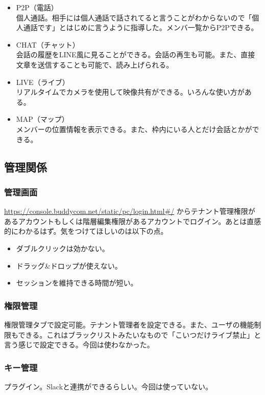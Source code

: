 \documentclass[dvipdfmx,jb5]{jreport}
\begin{document}
\begin{itemize}
\begin{itemize}
            \end{itemize}
      \item P2P（電話）\\
            個人通話。相手には個人通話で話されてると言うことがわからないので「個人通話です」とはじめに言うように指導した。メンバ一覧からP2Pできる。
      \item CHAT（チャット）\\
            会話の履歴をLINE風に見ることができる。会話の再生も可能。また、直接文章を送信することも可能で、読み上げられる。
      \item LIVE（ライブ）\\
            リアルタイムでカメラを使用して映像共有ができる。いろんな使い方がある。
      \item MAP（マップ）\\
            メンバーの位置情報を表示できる。また、枠内にいる人とだけ会話とかができる。
\end{itemize}

\subsection{管理関係}
\subsubsection{管理画面}
\url{https://console.buddycom.net/static/pc/login.html#/} からテナント管理権限があるアカウントもしくは階層編集権限があるアカウントでログイン。あとは直感的にわかるはず。気をつけてほしいのは以下の点。

\begin{itemize}
      \item ダブルクリックは効かない。
      \item ドラッグ\&ドロップが使えない。
      \item セッションを維持できる時間が短い。
\end{itemize}

\subsubsection{権限管理}
権限管理タブで設定可能。テナント管理者を設定できる。また、ユーザの機能制限もできる。これはブラックリストみたいなもので「こいつだけライブ禁止」と言う感じで設定できる。今回は使わなかった。

\subsubsection{キー管理}
プラグイン。Slackと連携ができるらしい。今回は使っていない。
\end{document}

